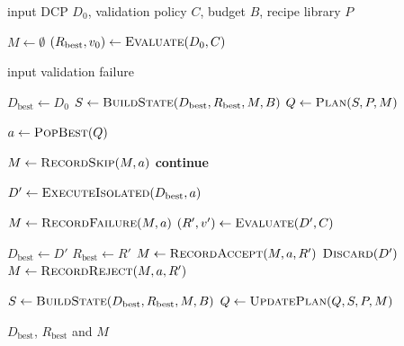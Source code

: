 \documentclass[conference]{IEEEtran}
\begin{document}
\begin{algorithm}[t]
\footnotesize
\caption{Post-route ECO optimization in PACT.}
\label{alg:pact}
\begin{algorithmic}[1]
\Require input DCP $D_0$, validation policy $C$, budget $B$,
recipe library $P$

\State $M \gets \emptyset$ \label{alg:pact:init-memory}
\State $(R_{\mathrm{best}},v_0) \gets \textsc{Evaluate}(D_0,C)$ \label{alg:pact:init-eval}

 \label{alg:pact:init-check}
    \State \Return input validation failure \label{alg:pact:init-return}
\EndIf \label{alg:pact:init-check-end}

\State $D_{\mathrm{best}} \gets D_0$ \label{alg:pact:set-best}
\State $S \gets \textsc{BuildState}
(D_{\mathrm{best}},R_{\mathrm{best}},M,B)$ \label{alg:pact:build-state-init}
\State $Q \gets \textsc{Plan}(S,P,M)$ \label{alg:pact:plan-init}

 \label{alg:pact:loop-start}
    \State $a \gets \textsc{PopBest}(Q)$ \label{alg:pact:pop-best}

     \label{alg:pact:admissible-if}
        \State $M \gets \textsc{RecordSkip}(M,a)$ \label{alg:pact:record-skip}
        \State \textbf{continue} \label{alg:pact:skip-continue}
    \EndIf \label{alg:pact:admissible-end}

    \State $D' \gets
    \textsc{ExecuteIsolated}(D_{\mathrm{best}},a)$ \label{alg:pact:execute}

     \label{alg:pact:unavailable-if}
        \State $M \gets \textsc{RecordFailure}(M,a)$ \label{alg:pact:record-failure}
    \Else
        \State $(R',v') \gets \textsc{Evaluate}(D',C)$ \label{alg:pact:evaluate-candidate}

         \label{alg:pact:accept-if}
            \State $D_{\mathrm{best}} \gets D'$ \label{alg:pact:update-best}
            \State $R_{\mathrm{best}} \gets R'$ \label{alg:pact:update-report}
            \State $M \gets
            \textsc{RecordAccept}(M,a,R')$ \label{alg:pact:record-accept}
        \Else \label{alg:pact:reject-else}
            \State $\textsc{Discard}(D')$ \label{alg:pact:discard}
            \State $M \gets
            \textsc{RecordReject}(M,a,R')$ \label{alg:pact:reject-record}
        \EndIf
    \EndIf

    \State $S \gets \textsc{BuildState}
    (D_{\mathrm{best}},R_{\mathrm{best}},M,B)$ \label{alg:pact:rebuild-state}
    \State $Q \gets \textsc{UpdatePlan}(Q,S,P,M)$ \label{alg:pact:update-plan}
\EndWhile \label{alg:pact:loop-end}

\State \Return $D_{\mathrm{best}}$, $R_{\mathrm{best}}$ and $M$ \label{alg:pact:return}
\end{algorithmic}
\end{algorithm}
\end{document}
